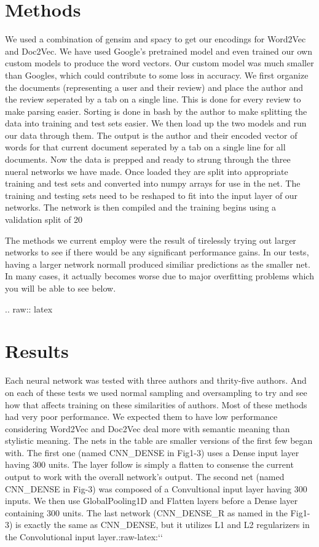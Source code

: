 \documentclass[conference]{IEEEtran}
\begin{document}
\section{Methods}
We used a combination of gensim and spacy to get our encodings for Word2Vec and Doc2Vec. We have used Google's pretrained model and even trained our own custom models to produce the word vectors. Our custom model was much smaller than Googles, which could contribute to some loss in accuracy. We first organize the documents (representing a user and their review) and place the author and the review seperated by a tab on a single line. This is done for every review to make parsing easier. Sorting is done in bash by the author to make splitting the data into training and test sets easier. We then load up the two models and run our data through them. The output is the author and their encoded vector of words for that current document seperated by a tab on a single line for all documents. Now the data is prepped and ready to strung through the three nueral networks we have made. Once loaded they are split into appropriate training and test sets and converted into numpy arrays for use in the net. The training and testing sets need to be reshaped to fit into the input layer of our networks. The network is then compiled and the training begins using a validation split of 20%

The methods we current employ were the result of tirelessly trying out larger networks to see if there would be any significant performance gains. In our tests, having a larger network normall produced similiar predictions as the smaller net. In many cases, it actually becomes worse due to major overfitting problems which you will be able to see below.

.. raw:: latex

   \section{Results}

Each neural network was tested with three authors and thrity-five
authors. And on each of these tests we used normal sampling and
oversampling to try and see how that affects training on these
similarities of authors. Most of these methods had very poor
performance. We expected them to have low performance considering
Word2Vec and Doc2Vec deal more with semantic meaning than stylistic
meaning. The nets in the table are smaller versions of the first few
began with. The first one (named CNN\_DENSE in Fig1-3) uses a Dense
input layer having 300 units. The layer follow is simply a flatten to
consense the current output to work with the overall network's output.
The second net (named CNN\_DENSE in Fig-3) was composed of a
Convultional input layer having 300 inputs. We then use GlobalPooling1D
and Flatten layers before a Dense layer containing 300 units. The last
network (CNN\_DENSE\_R as named in the Fig1-3) is exactly the same as
CNN\_DENSE, but it utilizes L1 and L2 regularizers in the Convolutional
input layer.:raw-latex:`\cite{b4}`
\end{document}
